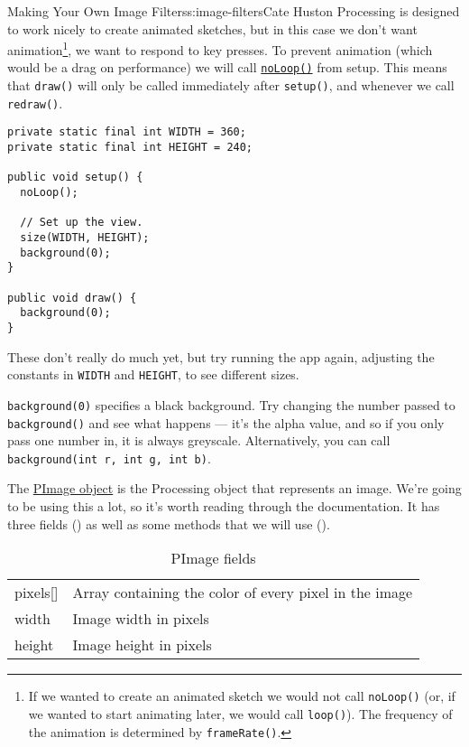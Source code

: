 \begin{aosachapter}{Making Your Own Image Filters}{s:image-filters}{Cate Huston}
Processing is designed to work nicely to create animated sketches, but
in this case we don't want animation\footnote{If we wanted to create an
  animated sketch we would not call \texttt{noLoop()} (or, if we wanted
  to start animating later, we would call \texttt{loop()}). The
  frequency of the animation is determined by \texttt{frameRate()}.}, we
want to respond to key presses. To prevent animation (which would be a
drag on performance) we will call
\href{http://www.processing.org/reference/noLoop_.html}{\texttt{noLoop()}}
from setup. This means that \texttt{draw()} will only be called
immediately after \texttt{setup()}, and whenever we call
\texttt{redraw()}.

\begin{verbatim}
private static final int WIDTH = 360;
private static final int HEIGHT = 240;

public void setup() {
  noLoop();

  // Set up the view.
  size(WIDTH, HEIGHT);
  background(0);
}
    
public void draw() {
  background(0);
}
\end{verbatim}

These don't really do much yet, but try running the app again, adjusting
the constants in \texttt{WIDTH} and \texttt{HEIGHT}, to see different
sizes.

\texttt{background(0)} specifies a black background. Try changing the
number passed to \texttt{background()} and see what happens --- it's the
alpha value, and so if you only pass one number in, it is always
greyscale. Alternatively, you can call
\texttt{background(int r, int g, int b)}.

\label{pimage}

The \href{http://processing.org/reference/PImage.html}{PImage object} is
the Processing object that represents an image. We're going to be using
this a lot, so it's worth reading through the documentation. It has
three fields () as well as
some methods that we will use
().

\begin{table}
\centering
{\footnotesize
{}
\begin{tabular}{ll}
\hline
pixels[] & Array containing the color of every pixel in the image \\
width & Image width in pixels \\
height & Image height in pixels \\
\hline
\end{tabular}
}
\caption{PImage fields}
\label{500l.imagefilters.pimagefields}
\end{table}


\end{aosachapter}
